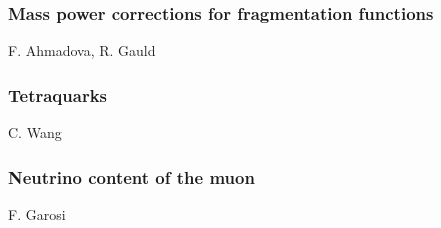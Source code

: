 \documentclass{FBR_Bericht_2025}
\begin{document}
\begin{refsection}
\subsubsection{Mass power corrections for fragmentation functions}
\begin{Namen}
F. Ahmadova, R. Gauld
\end{Namen}
%
\subsubsection{Tetraquarks}
\begin{Namen}
C. Wang
\end{Namen}
%
\subsubsection{Neutrino content of the muon}
\begin{Namen}
F. Garosi
\end{Namen}
\printbibliography[heading=subbibliography]
\end{refsection}

\end{document}
